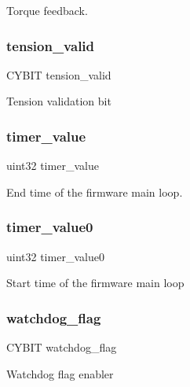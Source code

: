 Torque feedback. \mbox{\label{globals_8h_ac42fa606610c2600210d9b7b2c1d0882}} 
\subsubsection{tension\+\_\+valid}
{\footnotesize\ttfamily C\+Y\+B\+IT tension\+\_\+valid}

Tension validation bit \mbox{\label{globals_8h_ad47cd0e4d0fcf5739a88e52e949a8084}} 
\subsubsection{timer\+\_\+value}
{\footnotesize\ttfamily uint32 timer\+\_\+value}

End time of the firmware main loop. \mbox{\label{globals_8h_a9bab7f1b1cf2ba38d5968eee42644c32}} 
\subsubsection{timer\+\_\+value0}
{\footnotesize\ttfamily uint32 timer\+\_\+value0}

Start time of the firmware main loop \mbox{\label{globals_8h_a156a860c465529ff2f515725ab816a58}} 
\subsubsection{watchdog\+\_\+flag}
{\footnotesize\ttfamily C\+Y\+B\+IT watchdog\+\_\+flag}

Watchdog flag enabler 